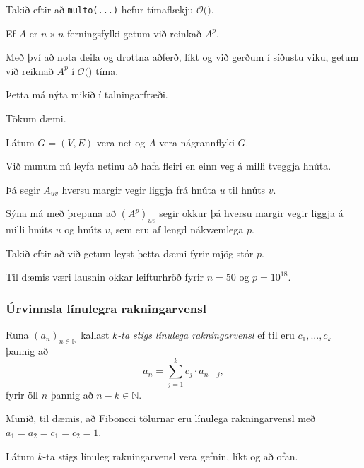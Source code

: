 {
}

{
	{
		\item<1-> Takið eftir að \texttt{multo(...)} hefur tímaflækju $\mathcal{O}($\onslide<2->{$n^3$}$)$.
		\item<3-> Ef $A$ er $n \times n$ ferningsfylki getum við reinkað $A^p$.
		\item<4-> Með því að nota deila og drottna aðferð, líkt og við gerðum í síðustu viku, getum við reiknað $A^p$ í
					$\mathcal{O}($\onslide<5->{$n^3 \log p$}$)$ tíma.
		\item<6-> Þetta má nýta mikið í talningarfræði.
		\item<7-> Tökum dæmi.
	}
}

{
	{
		\item<1-> Látum $G = (V, E)$ vera net og $A$ vera nágrannflyki $G$.
		\item<2-> Við munum nú leyfa netinu að hafa fleiri en einn veg á milli tveggja hnúta.
		\item<3-> Þá segir $A_{uv}$ hversu margir vegir liggja frá hnúta $u$ til hnúts $v$.
		\item<4-> Sýna má með þrepuna að $(A^p)_{uv}$ segir okkur þá hversu margir vegir liggja á milli hnúts $u$ og hnúts $v$,
					sem eru af lengd nákvæmlega $p$.
		\item<5-> Takið eftir að við getum leyst þetta dæmi fyrir mjög stór $p$.
		\item<6-> Til dæmis væri lausnin okkar leifturhröð fyrir $n = 50$ og $p = 10^{18}$.
	}
}

{
	\frametitle{Úrvinnsla línulegra rakningarvensl}
	{
		\item<1-> Runa $(a_n)_{n \in \mathbb{N}}$ kallast \emph{$k$-ta stigs línulega rakningarvensl} ef til eru $c_1, ..., c_k$ þannig að
		\[
			a_n = \sum_{j = 1}^k c_j \cdot a_{n - j},
		\]
		fyrir öll $n$ þannig að $n - k \in \mathbb{N}$.
		\item<2-> Munið, til dæmis, að Fiboncci tölurnar eru línulega rakningarvensl með $a_1 = a_2 = c_1 = c_2 = 1$.
		\item<3-> Látum $k$-ta stigs línuleg rakningarvensl vera gefnin, líkt og að ofan.
	}
}

